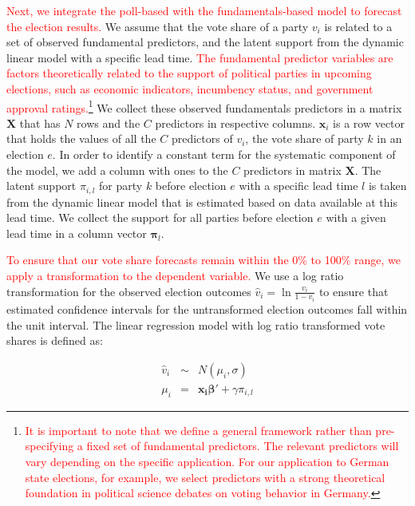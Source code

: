 \documentclass[doublespaced,12pt]{article}
\begin{document}
\begin{doublespacing}
\textcolor{red}{Next, we integrate the poll-based with the fundamentals-based model to forecast the election results.} We assume that the vote share of a party $v_i$ is related to a set of observed fundamental predictors, and the latent support from the dynamic linear model with a specific lead time. \textcolor{red}{The fundamental predictor variables are factors theoretically related to the support of political parties in upcoming elections, such as economic indicators, incumbency status, and government approval ratings.}\footnote{\textcolor{red}{It is important to note that we define a general framework rather than pre-specifying a fixed set of fundamental predictors. The relevant predictors will vary depending on the specific application. For our application to German state elections, for example, we select predictors with a strong theoretical foundation in political science debates on voting behavior in Germany.}} We collect these observed fundamentals predictors in a matrix $\bm{X}$ that has $N$ rows and the $C$ predictors in respective columns.  
$\bm{x}_i$ is a row vector that holds the values of all the $C$ predictors of $v_i$, the vote share of party $k$ in an election $e$. In order to identify a constant term for the systematic component of the model, we add a column with ones to the $C$ predictors in matrix $\bm{X}$. The latent support ${\pi}_{i,l}$ for party $k$ before election $e$ with a specific lead time $l$ is taken from the dynamic linear model that is estimated based on data available at this lead time. We collect the support for all parties before election $e$ with a given lead time in a column vector $\bm{\pi}_{l}$. %

\textcolor{red}{To ensure that our vote share forecasts remain within the 0\% to 100\% range, we apply a transformation to the dependent variable.}  We use a log ratio transformation for the observed election outcomes $\hat{v}_i = \ln{\frac{v_i}{1-v_i}}$ to ensure that estimated confidence intervals for the untransformed election outcomes fall within the unit interval.  The linear regression model with log ratio transformed vote shares is defined as:

\begin{eqnarray}
        \hat{v}_i &\sim& N\left(\mu_i, \sigma \right) \\
        \mu_i & =& \boldsymbol{x_i} \boldsymbol{\beta}' + \gamma {\pi}_{i,l}
\end{eqnarray}


\end{doublespacing}
\end{document}
